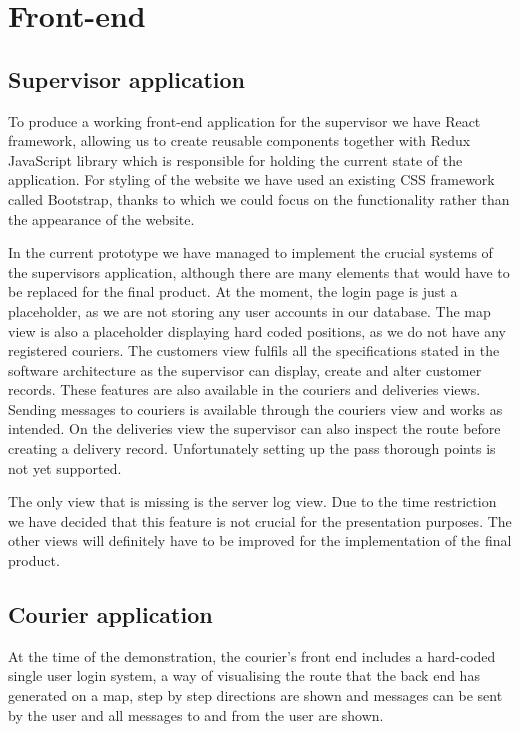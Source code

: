 

\section{Front-end}
\subsection{Supervisor application}
To produce a working front-end application for the supervisor we have React\cite{React} framework, allowing us to create reusable components together with Redux\cite{Redux} JavaScript library which is responsible for holding the current state of the application. For styling of the website we have used an existing CSS framework called Bootstrap\cite{Bootstrap}, thanks to which we could focus on the functionality rather than the appearance of the website.

In the current prototype we have managed to implement the crucial systems of the supervisors application, although there are many elements that would have to be replaced for the final product. At the moment, the login page is just a placeholder, as we are not storing any user accounts in our database. The map view is also a placeholder displaying hard coded positions, as we do not have any registered couriers. The customers view fulfils all the specifications stated in the software architecture as the supervisor can display, create and alter customer records. These features are also available in the couriers and deliveries views. Sending messages to couriers is available through the couriers view and works as intended. On the deliveries view the supervisor can also inspect the route before creating a delivery record. Unfortunately setting up the pass thorough points is not yet supported.

The only view that is missing is the server log view. Due to the time restriction we have decided that this feature is not crucial for the presentation purposes. The other views will definitely have to be improved for the implementation of the final product.
\subsection{Courier application}
At the time of the demonstration, the courier’s front end includes a hard-coded single user login system, a way of visualising the route that the back end has generated on a map, step by step directions are shown and messages can be sent by the user and all messages to and from the user are shown.

